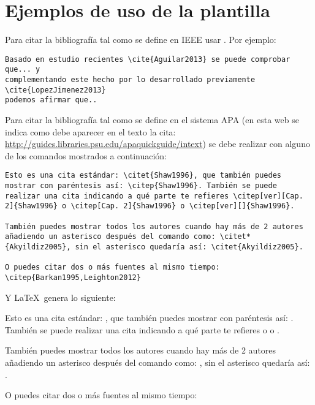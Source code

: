 \section{Ejemplos de uso de la plantilla}

Para citar la bibliografía tal como se define en IEEE usar \cite{ruiz2016guia}. Por ejemplo:

\begin{lstlisting}[style=Latex-color]
Basado en estudio recientes \cite{Aguilar2013} se puede comprobar que... y 
complementando este hecho por lo desarrollado previamente \cite{LopezJimenez2013} 
podemos afirmar que..
\end{lstlisting}

Para citar la bibliografía tal como se define en el sistema APA (en esta web se indica como debe aparecer en el texto la cita: \url{http://guides.libraries.psu.edu/apaquickguide/intext}) se debe realizar con alguno de los comandos mostrados a continuación:

\begin{lstlisting}[style=Latex-color]
Esto es una cita estándar: \citet{Shaw1996}, que también puedes mostrar con paréntesis así: \citep{Shaw1996}. También se puede realizar una cita indicando a qué parte te refieres \citep[ver][Cap. 2]{Shaw1996} o \citep[Cap. 2]{Shaw1996} o \citep[ver][]{Shaw1996}. 

También puedes mostrar todos los autores cuando hay más de 2 autores añadiendo un asterisco después del comando como: \citet*{Akyildiz2005}, sin el asterisco quedaría así: \citet{Akyildiz2005}.

O puedes citar dos o más fuentes al mismo tiempo: \citep{Barkan1995,Leighton2012}

\end{lstlisting}
Y \LaTeX~genera lo siguiente:
\\
\par Esto es una cita estándar: \citet{Shaw1996}, que también puedes mostrar con paréntesis así: \citep{Shaw1996}. También se puede realizar una cita indicando a qué parte te refieres \citep[ver][Cap. 2]{Shaw1996} o \citep[Cap. 2]{Shaw1996} o \citep[ver][]{Shaw1996}. 
\\
\par También puedes mostrar todos los autores cuando hay más de 2 autores añadiendo un asterisco después del comando como: \citet*{Akyildiz2005}, sin el asterisco quedaría así: \citet{Akyildiz2005}.
\\
\par O puedes citar dos o más fuentes al mismo tiempo: \citep{Barkan1995,Leighton2012}


